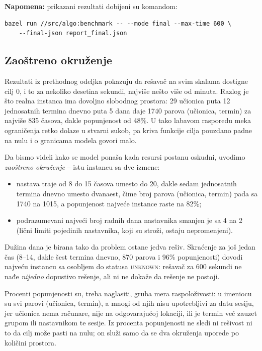 \documentclass[12pt,oneside]{memoir}
\begin{document}
\textbf{Napomena:} prikazani rezultati dobijeni su komandom:

\begin{english}
\begin{verbatim}
bazel run //src/algo:benchmark -- --mode final --max-time 600 \
    --final-json report_final.json
\end{verbatim}
\end{english}

\subsection{Zaoštreno okruženje}
\label{sec:finalna_zaostreno}

Rezultati iz prethodnog odeljka pokazuju da rešavač na svim skalama
dostigne cilj 0, i to za nekoliko desetina sekundi, najviše nešto više
od minuta. Razlog je što realna instanca ima dovoljno slobodnog
prostora: 29 učionica puta 12 jednosatnih termina dnevno puta 5 dana
daje 1740 parova (učionica, termin) za najviše 835 časova, dakle
popunjenost od 48\%. U tako labavom rasporedu meka ograničenja retko
dolaze u stvarni sukob, pa kriva funkcije cilja pouzdano padne na nulu i
o granicama modela govori malo.

Da bismo videli kako se model ponaša kada resursi postanu oskudni,
uvodimo \emph{zaoštreno okruženje} -- istu instancu sa dve izmene:

\begin{itemize}
\item nastava traje od 8 do 15 časova umesto do 20, dakle sedam
  jednosatnih termina dnevno umesto dvanaest, čime broj parova
  (učionica, termin) pada sa 1740 na 1015, a popunjenost najveće
  instance raste na 82\%;
\item podrazumevani najveći broj radnih dana nastavnika smanjen je sa 4
  na 2 (lični limiti pojedinih nastavnika, koji su stroži,
  ostaju nepromenjeni).
\end{itemize}

Dužina dana je birana tako da problem ostane jedva rešiv. Skraćenje za
još jedan čas (8--14, dakle šest termina dnevno, 870 parova i 96\%
popunjenosti) dovodi najveću instancu sa osobljem do statusa
\textsc{unknown}: rešavač za 600 sekundi ne nađe \emph{nijedno}
dopustivo rešenje, ali ni ne dokaže da rešenje ne postoji.

Procenti popunjenosti su, treba naglasiti, gruba mera raspoloživosti: u
imeniocu su svi parovi (učionica, termin), a mnogi od njih nisu
upotrebljivi za datu sesiju, jer učionica nema računare, nije na
odgovarajućoj lokaciji, ili je termin već zauzet grupom ili nastavnikom
te sesije. Iz procenta popunjenosti ne sledi ni rešivost ni to da cilj
može pasti na nulu; on služi samo da se dva okruženja uporede po
količini prostora.
\end{document}
